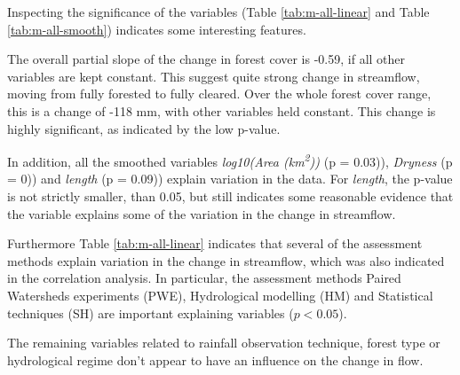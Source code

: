 \documentclass[]{elsarticle} %
\begin{document}
Inspecting the significance of the variables (Table \ref{tab:m-all-linear} and Table \ref{tab:m-all-smooth}) indicates some interesting features.

The overall partial slope of the change in forest cover is -0.59, if all other variables are kept constant. This suggest quite strong change in streamflow, moving from fully forested to fully cleared. Over the whole forest cover range, this is a change of -118 mm, with other variables held constant. This change is highly significant, as indicated by the low p-value.

In addition, all the smoothed variables \emph{log10(Area (km\textsuperscript{2}))} (p = 0.03)), \emph{Dryness} (p = 0)) and \emph{length} (p = 0.09)) explain variation in the data. For \emph{length}, the p-value is not strictly smaller, than 0.05, but still indicates some reasonable evidence that the variable explains some of the variation in the change in streamflow.

Furthermore Table \ref{tab:m-all-linear} indicates that several of the assessment methods explain variation in the change in streamflow, which was also indicated in the correlation analysis. In particular, the assessment methods Paired Watersheds experiments (PWE), Hydrological modelling (HM) and Statistical techniques (SH) are important explaining variables (\(p < 0.05\)).

The remaining variables related to rainfall observation technique, forest type or hydrological regime don't appear to have an influence on the change in flow.
\end{document}
